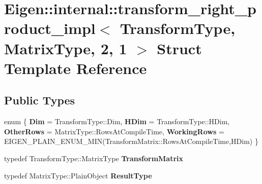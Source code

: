 \hypertarget{struct_eigen_1_1internal_1_1transform__right__product__impl_3_01_transform_type_00_01_matrix_type_00_012_00_011_01_4}{}\section{Eigen\+::internal\+::transform\+\_\+right\+\_\+product\+\_\+impl$<$ Transform\+Type, Matrix\+Type, 2, 1 $>$ Struct Template Reference}
\label{struct_eigen_1_1internal_1_1transform__right__product__impl_3_01_transform_type_00_01_matrix_type_00_012_00_011_01_4}
\subsection*{Public Types}
\begin{DoxyCompactItemize}
\item 
\mbox{\label{struct_eigen_1_1internal_1_1transform__right__product__impl_3_01_transform_type_00_01_matrix_type_00_012_00_011_01_4_adb1f89f1f62b14967233d02fc08409fd}} 
enum \{ {\bfseries Dim} = Transform\+Type\+::Dim, 
{\bfseries H\+Dim} = Transform\+Type\+::H\+Dim, 
{\bfseries Other\+Rows} = Matrix\+Type\+::Rows\+At\+Compile\+Time, 
{\bfseries Working\+Rows} = E\+I\+G\+E\+N\+\_\+\+P\+L\+A\+I\+N\+\_\+\+E\+N\+U\+M\+\_\+\+M\+IN(Transform\+Matrix\+::Rows\+At\+Compile\+Time,H\+Dim)
 \}
\item 
\mbox{\label{struct_eigen_1_1internal_1_1transform__right__product__impl_3_01_transform_type_00_01_matrix_type_00_012_00_011_01_4_a0f0d2699493764b5395959268d57639c}} 
typedef Transform\+Type\+::\+Matrix\+Type {\bfseries Transform\+Matrix}
\item 
\mbox{\label{struct_eigen_1_1internal_1_1transform__right__product__impl_3_01_transform_type_00_01_matrix_type_00_012_00_011_01_4_a68d9a985332aec0d21f345830c3ea3bb}} 
typedef Matrix\+Type\+::\+Plain\+Object {\bfseries Result\+Type}
\end{DoxyCompactItemize}
